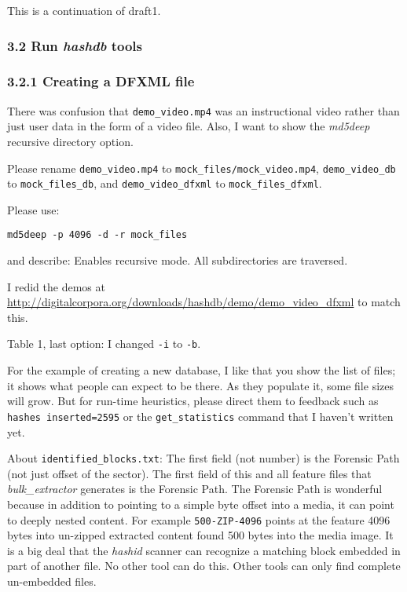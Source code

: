 \documentclass[12pt,twoside]{article}
\newcommand{\hdb}{\emph{hashdb}\xspace}
\newcommand{\bulk}{\emph{bulk\_extractor}\xspace}
\newcommand{\hid}{\emph{hashid}\xspace}
\newcommand{\mdd}{\emph{md5deep}\xspace}
\begin{document}
This is a continuation of draft1.

\subsubsection*{3.2 Run \hdb tools}
\subsubsection*{3.2.1 Creating a DFXML file}

There was confusion that \texttt{demo\_video.mp4} was an instructional
video rather than just user data in the form of a video file.
Also, I want to show the \mdd recursive directory option.
\begin{compactitem}
\item Please rename \texttt{demo\_video.mp4}
to \texttt{mock\_files/mock\_video.mp4},
\texttt{demo\_video\_db} to \texttt{mock\_files\_db},
and \texttt{demo\_video\_dfxml} to \texttt{mock\_files\_dfxml}.
\item Please use:
\begin{verbatim}
md5deep -p 4096 -d -r mock_files
\end{verbatim}
and describe: Enables recursive mode. All subdirectories are traversed.
\end{compactitem}
I redid the demos at
\url{http://digitalcorpora.org/downloads/hashdb/demo/demo\_video\_dfxml}
to match this.

Table 1, last option: I changed \texttt{-i} to \texttt{-b}.

For the example of creating a new database,
I like that you show the list of files; it shows what people can expect
to be there.
As they populate it, some file sizes will grow.
But for run-time heuristics, please direct them to feedback
such as \texttt{hashes inserted=2595} or the \texttt{get\_statistics}
command that I haven't written yet.

About \texttt{identified\_blocks.txt}:
The first field (not number) is the Forensic Path
(not just offset of the sector).
The first field of this and all feature files that \bulk generates
is the Forensic Path.
The Forensic Path is wonderful because in addition to pointing
to a simple byte offset into a media,
it can point to deeply nested content.
For example \texttt{500-ZIP-4096} points at the feature 4096 bytes into
un-zipped extracted content found 500 bytes into the media image.
It is a big deal that the \hid scanner
can recognize a matching block embedded in part of another file.
No other tool can do this.
Other tools can only find complete un-embedded files.
\end{document}
